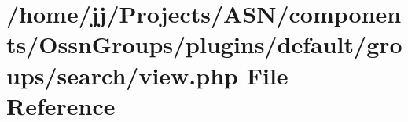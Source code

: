 \hypertarget{components_2_ossn_groups_2plugins_2default_2groups_2search_2view_8php}{}\section{/home/jj/\+Projects/\+A\+S\+N/components/\+Ossn\+Groups/plugins/default/groups/search/view.php File Reference}
\label{components_2_ossn_groups_2plugins_2default_2groups_2search_2view_8php}
